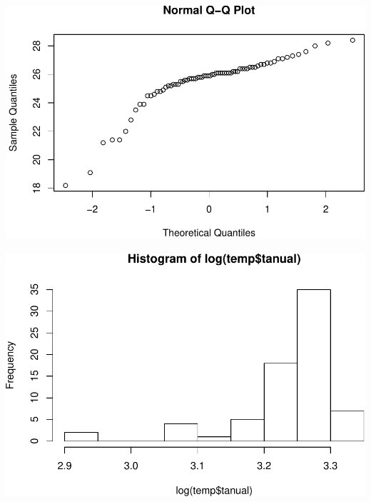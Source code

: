 \documentclass[11pt,]{article}
\newenvironment{Shaded}{\begin{snugshade}}{\end{snugshade}}
\newcommand{\KeywordTok}[1]{\textcolor[rgb]{0.13,0.29,0.53}{\textbf{#1}}}
\newcommand{\OperatorTok}[1]{\textcolor[rgb]{0.81,0.36,0.00}{\textbf{#1}}}
\newcommand{\NormalTok}[1]{#1}
\begin{document}
\begin{Shaded}
\end{Shaded}

\includegraphics[width=600px]{Proyecto-Precipitaciones_files/figure-latex/esda-temp-2}

\begin{Shaded}
\end{Shaded}

\includegraphics[width=600px]{Proyecto-Precipitaciones_files/figure-latex/esda-temp-3}
\end{document}
